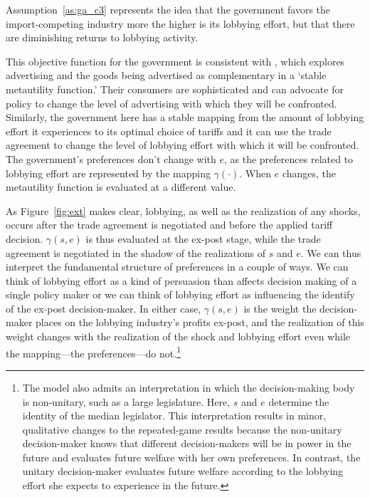 \documentclass[12pt,titlepage]{article}
\newcommand{\ga}{\gamma}
\begin{document}
Assumption~\ref{as:ga_c3} represents the idea that the government favors the import-competing industry more the higher is its lobbying effort, but that there are diminishing returns to lobbying activity. 

This objective function for the government is consistent with \Textcite{bm93}, which explores advertising and the goods being advertised as complementary in a `stable metautility function.' Their consumers are sophisticated and can advocate for policy to change the level of advertising with which they will be confronted. Similarly, the government here has a stable mapping from the amount of lobbying effort it experiences to its optimal choice of tariffs and it can use the trade agreement to change the level of lobbying effort with which it will be confronted. The government's preferences don't change with $e$, as the preferences related to lobbying effort are represented by the mapping $\ga(\cdot)$. When $e$ changes, the metautility function is evaluated at a different value.

As Figure~\ref{fig:ext} makes clear, lobbying, as well as the realization of any shocks, occurs after the trade agreement is negotiated and before the applied tariff decision. $\ga(s,e)$ is thus evaluated at the ex-post stage, while the trade agreement is negotiated in the shadow of the realizations of $s$ and $e$. We can thus interpret the fundamental structure of preferences in a couple of ways. We can think of lobbying effort as a kind of persuasion than affects decision making of a single policy maker or we can think of lobbying effort as influencing the identify of the ex-post decision-maker. In either case, $\ga(s,e)$ is the weight the decision-maker places on the lobbying industry's profits ex-post, and the realization of this weight changes with the realization of the shock and lobbying effort even while the mapping---the preferences---do not.\footnote{The model also admits an interpretation in which the decision-making body is non-unitary, such as a large legislature. Here, $s$ and $e$ determine the identity of the median legislator. This interpretation results in minor, qualitative changes to the repeated-game results because the non-unitary decision-maker knows that different decision-makers will be in power in the future and evaluates future welfare with her own preferences. In contrast, the unitary decision-maker evaluates future welfare according to the lobbying effort she expects to experience in the future.} 
\end{document}
